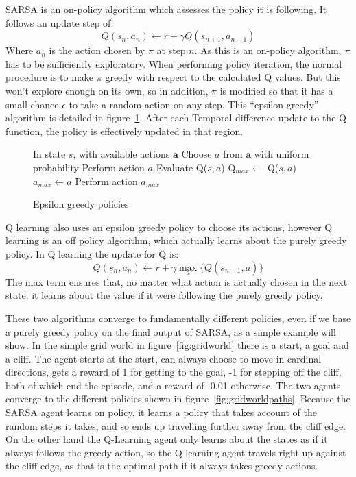 SARSA is an on-policy algorithm which assesses the policy it is following. It follows an update step of:
\begin{equation}
Q(s_n,a_n) \gets r + \gamma Q(s_{n+1}, a_{n+1}) 
\end{equation}
Where $a_n$ is the action chosen by $\pi$ at step $n$. As this is an on-policy algorithm, $\pi$ has to be sufficiently exploratory. When performing policy iteration, the normal procedure is to make $\pi$ greedy with respect to the calculated Q values. But this won't explore enough on its own, so in addition, $\pi$ is modified so that it has a small chance $\epsilon$ to take a random action on any step. This ``epsilon greedy'' algorithm is detailed in figure~\ref{alg:epsgreedy}. After each Temporal difference update to the Q function, the policy is effectively updated in that region.

\begin{figure}
\centering
\begin{algorithmic}
\State In state $s$, with available actions $\boldsymbol{a}$
\WithP[$\epsilon$]
	\State Choose $a$ from $\boldsymbol{a}$ with uniform probability
	\State Perform action $a$
\ElseP
		\State Evaluate Q($s,a$)
			\State Q$_{max} \gets $ Q($s,a$)
			\State $a_{max} \gets a$
		\EndIf
	\EndFor
	\State Perform action $a_{max}$
\EndP
\end{algorithmic}
\caption{Epsilon greedy policies}
\label{alg:epsgreedy}
\end{figure}

Q learning also uses an epsilon greedy policy to choose its actions, however Q learning is an off policy algorithm, which actually learns about the purely greedy policy. In Q learning the update for Q is:
\begin{equation}
Q(s_n,a_n) \gets r + \gamma \max_a \{Q(s_{n+1}, a) \}
\end{equation}
The max term ensures that, no matter what action is actually chosen in the next state, it learns about the value if it were following the purely greedy policy.

These two algorithms converge to fundamentally different policies, even if we base a purely greedy policy on the final output of SARSA, as a simple example will show. In the simple grid world in figure~\ref{fig:gridworld} there is a start, a goal and a cliff. The agent starts at the start, can always choose to move in cardinal directions, gets a reward of 1 for getting to the goal, -1 for stepping off the cliff, both of which end the episode, and  a reward of -0.01 otherwise. The two agents converge to the different policies shown in figure~\ref{fig:gridworldpaths}. Because the SARSA agent learns on policy, it learns a policy that takes account of the random steps it takes, and so ends up travelling further away from the cliff edge. On the other hand the Q-Learning agent only learns about the states as if it always follows the greedy action, so the Q learning agent travels right up against the cliff edge, as that is the optimal path if it always takes greedy actions.

